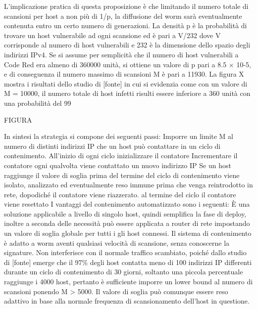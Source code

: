L’implicazione pratica di questa proposizione è che limitando il numero totale di scansioni per host a non più di 1/p, la diffusione del worm sarà eventualmente contenuta entro un certo numero di generazioni.
La densità p è la probabilità di trovare un host vulnerabile ad ogni scansione ed è pari a V/232 dove V corrisponde al numero di host vulnerabili e 232 è la dimensione dello spazio degli indirizzi IPv4.
Se si assume per semplicità che il numero di host vulnerabili a Code Red era almeno di 360000 unità, si ottiene un valore di p pari a 8.5 × 10-5, e di conseguenza il numero massimo di scansioni M è pari a 11930.
La figura X mostra i risultati dello studio di [fonte] in cui si evidenzia come con un valore di M = 10000, il numero totale di host infetti risulti essere inferiore a 360 unità con una probabilità del 99%

FIGURA

In sintesi la strategia si compone dei seguenti passi:
Imporre un limite M al numero di distinti indirizzi IP che un host può contattare in un ciclo di contenimento. All’inizio di ogni ciclo inizializzare il contatore
Incrementare il contatore ogni qualvolta viene contattato un nuovo indirizzo IP
Se un host raggiunge il valore di soglia prima del termine del ciclo di contenimento viene isolato, analizzato ed eventualmente reso immune prima che venga reintrodotto in rete, dopodiché il contatore viene riazzerato.
al termine del ciclo il contatore viene resettato
I vantaggi del contenimento automatizzato sono i seguenti:
È una soluzione applicabile a livello di singolo host, quindi semplifica la fase di deploy, inoltre a seconda delle necessità può essere applicata a router di rete impostando un valore di soglia globale per tutti i gli host connessi.
Il sistema di contenimento è adatto a worm aventi qualsiasi velocità di scansione, senza conoscerne la signature.
Non interferisce con il normale traffico scambiato, poiché dallo studio di [fonte] emerge che il 97\% degli host contatta meno di 100 indirizzi IP differenti durante un ciclo di contenimento di 30 giorni, soltanto una piccola percentuale raggiunge i 4000 host, pertanto è sufficiente imporre un lower bound al numero di scansioni ponendo M > 5000. Il valore di soglia può comunque essere reso adattivo in base alla normale frequenza di scansionamento dell’host in questione.


